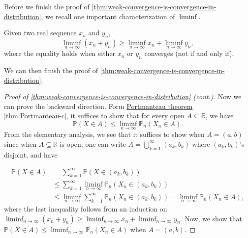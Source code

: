 Before we finish the proof of \autoref{thm:weak-convergence-is-convergence-in-distribution}, we recall one important characterization of \(\liminf\).

\begin{prev}
	Given two real sequence \(x_n\) and \(y_n\),
	\[
		\liminf_{n \to \infty} (x_n + y_n) \geq \liminf_{n \to \infty} x_n + \liminf_{n \to \infty} y_n,
	\]
	where the equality holds when either \(x_n\) or \(y_n\) converges (not if and only if).
\end{prev}

We can then finish the proof of \autoref{thm:weak-convergence-is-convergence-in-distribution}.

\begin{proof}[Proof of \autoref{thm:weak-convergence-is-convergence-in-distribution} (cont.)]\label{pf:thm:weak-convergence-is-convergence-in-distribution}
	Now we can prove the backward direction. Form \hyperref[thm:Portmanteau]{Portmanteau theorem} \autoref{thm:Portmanteau-c}, it suffices to show that for every open \(A \subseteq \mathbb{R} \), we have
	\[
		\mathbb{P} (X \in A) \leq \liminf_{n \to \infty} \mathbb{P} _{n}(X_n \in A).
	\]
	From the elementary analysis, we see that it suffices to show when \(A = (a, b)\) since when \(A \subseteq \mathbb{R} \) is open, one can write \(A = \bigcup_{k=1}^{\infty} (a_k, b_k)\) where \((a_k, b_k)\)'s disjoint, and have

	\begin{align*}
		\mathbb{P} (X \in A)
		 & = \sum_{k=1}^{\infty} \mathbb{P} (X \in (a_k, b_k))                                                                            \\
		 & \leq \sum_{k=1}^{\infty} \liminf_{n \to \infty} \mathbb{P} _{n}(X_n \in (a_k, b_k)) \tag*{assume true for each \((a_k, b_k)\)} \\
		 & \leq \liminf_{n \to \infty} \sum_{k=1}^{\infty} \mathbb{P} _{n}(X_n \in (a_k, b_k))
		= \liminf_{n \to \infty} \mathbb{P} _{n}(X_n \in A),
	\end{align*}
	where the last inequality follows from an induction on \(\liminf_{n \to \infty} (x_n + y_n) \geq \liminf_{n \to \infty} x_n + \liminf_{n \to \infty} y_n\). Now, we show that \(\mathbb{P} (X \in A) \leq \liminf_{n \to \infty} \mathbb{P} _{n}(X_n \in A)\) when \(A = (a, b)\).


\end{proof}
